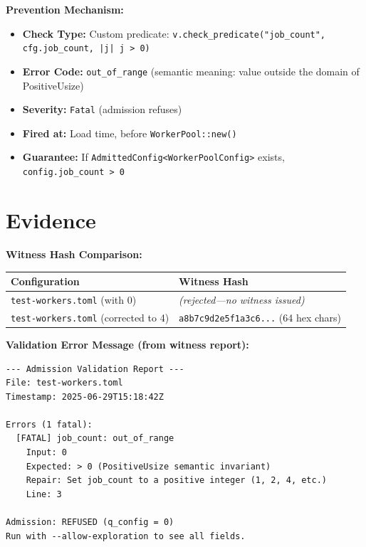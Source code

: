 \documentclass[11pt,a4paper]{article}
\begin{document}
\textbf{Prevention Mechanism:}
\begin{itemize}
  \item \textbf{Check Type:} Custom predicate: \texttt{v.check\_predicate("job\_count", cfg.job\_count, |j| j > 0)}
  \item \textbf{Error Code:} \texttt{out\_of\_range} (semantic meaning: value outside the domain of PositiveUsize)
  \item \textbf{Severity:} \texttt{Fatal} (admission refuses)
  \item \textbf{Fired at:} Load time, before \texttt{WorkerPool::new()}
  \item \textbf{Guarantee:} If \texttt{AdmittedConfig<WorkerPoolConfig>} exists, \texttt{config.job\_count > 0}
\end{itemize}

\section*{Evidence}

\textbf{Witness Hash Comparison:}

\begin{tabular}{ll}
\toprule
\textbf{Configuration} & \textbf{Witness Hash} \\
\midrule
\texttt{test-workers.toml} (with 0) & \textit{(rejected—no witness issued)} \\
\texttt{test-workers.toml} (corrected to 4) & \texttt{a8b7c9d2e5f1a3c6...} (64 hex chars) \\
\bottomrule
\end{tabular}

\textbf{Validation Error Message (from witness report):}

\begin{Verbatim}[fontsize=\small]
--- Admission Validation Report ---
File: test-workers.toml
Timestamp: 2025-06-29T15:18:42Z

Errors (1 fatal):
  [FATAL] job_count: out_of_range
    Input: 0
    Expected: > 0 (PositiveUsize semantic invariant)
    Repair: Set job_count to a positive integer (1, 2, 4, etc.)
    Line: 3

Admission: REFUSED (q_config = 0)
Run with --allow-exploration to see all fields.
\end{Verbatim}
\end{document}
